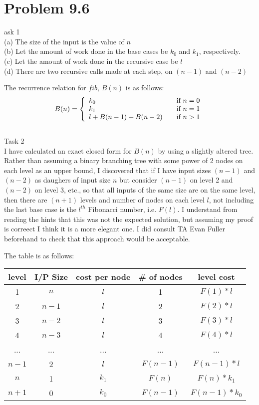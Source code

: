 \documentclass[12pt,letterpaper]{article}
\newcommand\hwnum{9}                  %
\newenvironment{answer}[5]{
  \section*{Problem \hwnum.#1}
}{\newpage}
\begin{document}
\begin{answer}{6}
\textbf{Analysis 2} \\

Task 1\\

(a) The size of the input is the value of $n$\\
(b) Let the amount of work done in the base cases be $k_0$ and $k_1$, respectively.\\
(c) Let the amount of work done in the recursive case be $l$\\
(d) There are two recursive calls made at each step, on $(n-1)$ and $(n-2)$

The recurrence relation for $fib$, $B(n)$ is as follows:
\[ B(n) = \left\{ 
  \begin{array}{l l}
    k_0 & \quad \text{if $n = 0$}\\
    k_1 & \quad \text{if $n = 1$}\\
    l + B(n - 1) + B(n - 2) & \quad \text{if $n > 1$}
  \end{array} \right.\]\\

Task 2\\

I have calculated an exact closed form for $B(n)$ by using a slightly altered tree. Rather than assuming a binary branching tree with some power of 2 nodes on each level as an upper bound, I discovered that if I have input sizes $(n-1)$ and $(n-2)$ as daughers of input size $n$ but consider $(n-1)$ on level 2 and $(n-2)$ on level 3, etc., so that all inputs of the same size are on the same level, then there are $(n+1)$ levels and number of nodes on each level $l$, not including the last base case is the $l^{th}$ Fibonacci number, i.e. $F(l)$. I understand from reading the hints that this was not the expected solution, but assuming my proof is correect I think it is a more elegant one. I did consult TA Evan Fuller beforehand to check that this approach would be acceptable.

The table is as follows:\\

\begin{tabular}{c|c|c|c|c}
level & I/P Size & cost per node & \# of nodes & level cost \\ \hline
1 & $n$ & $l$ & 1 & $F(1)*l$\\
2 & $n-1$ & $l$ & 2 & $F(2)*l$\\
3 & $n-2$ & $l$ & 3 & $F(3)*l$\\
4 & $n-3$ & $l$ & 4 & $F(4)*l$\\
... & ... & ... & ... & ...\\
$n-1$ & 2 & $l$ & $F(n-1)$ & $F(n-1)*l$\\
$n$ & 1 & $k_1$ & $F(n)$ & $F(n)*k_1$\\
$n+1$ & 0 & $k_0$ & $F(n-1)$ & $F(n-1)*k_0$\\
\end{tabular}


\end{answer}
\end{document}
